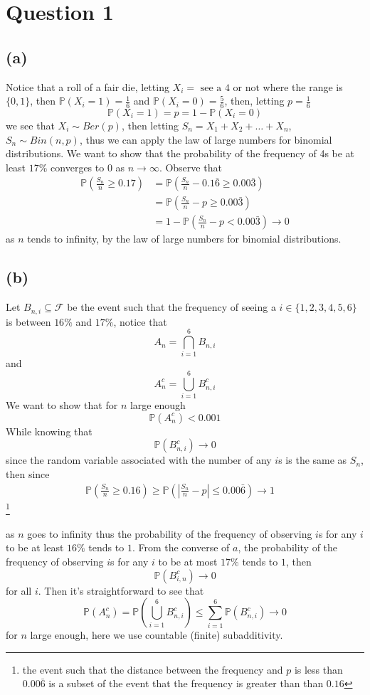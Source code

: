 \documentclass[a4paper,11pt]{article}
\newcommand{\prob}{\mathbb{P}}
\newcommand{\asstnumber}{3}
\newcommand{\assigntop}{
  \fancyhead[L]{}
  \fancyhead[C]{\Large Math 356 -- Fall 2023\\ Assignment \asstnumber}
  \fancyhead[R]{ }
}
\begin{document}
\assigntop

\section*{Question 1 }
\subsection*{(a)}

Notice that  a roll of a fair die, letting $X_i = \text{ see a 4 or not}$ where the range is $\{0,1\}$, then $\prob(X_i = 1) = \frac{1}{6}$ and $\prob(X_i = 0) = \frac{5}{6}$, then, letting $p = \frac{1}{6}$
$$\prob(X_i = 1) = p = 1 - \prob(X_i = 0)$$
we see that $X_i \sim Ber(p)$, then letting $S_n = X_1 + X_2 + \ldots + X_n$, $S_n \sim Bin(n,p)$, thus we can apply the law of large numbers for binomial distributions. We want to show that the probability of the frequency of 4s be at least $17 \%$ converges to 0 as $n \to \infty$. Observe that 
\begin{align*}
	\prob\left ( \frac{S_n}{n} \geq 0.17 \right) &= \prob\left(\frac{S_n}{n} - 0.1\bar{6} \geq 0.00\bar{3}\right)\\
	&= \prob\left(\frac{S_n}{n} - p  \geq 0.00\bar{3} \right)\\
	&= 1 - \prob \left(\frac{S_n}{n} - p < 0.00\bar{3}\right) \to 0 
	\end{align*}
	as $n$ tends to infinity, by the law of large numbers for binomial distributions. 
	\subsection*{(b)}
 Let $B_{n,i} \subseteq \mathcal{F}$ be the event such that the frequency of seeing a $i \in \{1,2,3,4,5,6\}$ is between $16\%$ and $17\%$, notice that $$A_n = \bigcap_{i=1}^6 B_{n,i}$$
 and
 $$A_n^c = \bigcup_{i=1}^6 B_{n,i}^c$$
 We want to show that for $n$ large enough
 $$ \prob \left( A_n^c \right) < 0.001$$ 
 While knowing that 
 $$ \prob(B_{n,i}^c) \to 0$$ 
 since the random variable associated with the number of any $i$s is the same as $S_n$, then since
 \begin{align*}  
     \prob(\tfrac{S_n}{n} \geq 0.16) \geq \prob(|\tfrac{S_n}{n} - p| \leq 0.00\bar{6} ) \to 1  \quad 
 \end{align*}
 \footnote{the event such that the distance between the frequency
 and $p$ is less than $0.00\bar{6}$ is a subset of the event that the frequency is greater than than $0.16$  }

 as $n$ goes to infinity thus the probability of the frequency of observing $i$s for any $i$ to be at least $16\%$ tends to $1$. From the converse of $a$, the probability of the frequency of observing $i$s for any $i$ to be at most $17\%$ tends to $1$, then 
 $$\prob(B_{i,n}^c) \to 0$$
 for all $i$. 
 Then it's straightforward to see that 
 $$\prob(A_n^c) = \prob\left(\bigcup_{i=1}^6 B_{n,i}^c \right) \leq \sum_{i=1}^6 \prob(B_{n,i}^c) \to 0$$
 for $n$ large enough, here we use countable (finite) subadditivity. 
	
\end{document}

